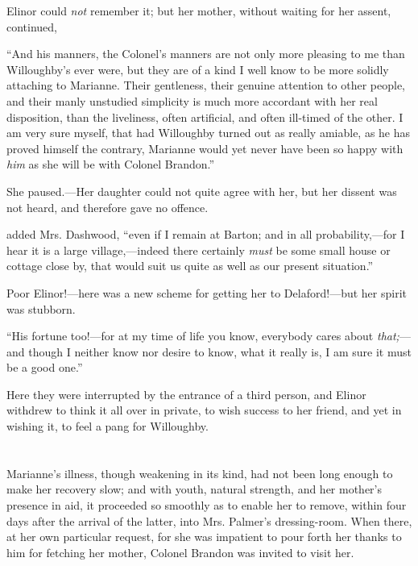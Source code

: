 Elinor could {\em not} remember it; but her mother, without waiting for her assent, continued,

“And his manners, the Colonel's manners are not only more pleasing to me than Willoughby's ever were, but they are of a kind I well know to be more solidly attaching to Marianne. Their gentleness, their genuine attention to other people, and their manly unstudied simplicity is much more accordant with her real disposition, than the liveliness, often artificial, and often ill-timed of the other. I am very sure myself, that had Willoughby turned out as really amiable, as he has proved himself the contrary, Marianne would yet never have been so happy with {\em him} as she will be with Colonel Brandon.”

She paused.---Her daughter could not quite agree with her, but her dissent was not heard, and therefore gave no offence.

 added Mrs. Dashwood, “even if I remain at Barton; and in all probability,---for I hear it is a large village,---indeed there certainly {\em must} be some small house or cottage close by, that would suit us quite as well as our present situation.”

Poor Elinor!---here was a new scheme for getting her to Delaford!---but her spirit was stubborn.

“His fortune too!---for at my time of life you know, everybody cares about {\em that;}---and though I neither know nor desire to know, what it really is, I am sure it must be a good one.”

Here they were interrupted by the entrance of a third person, and Elinor withdrew to think it all over in private, to wish success to her friend, and yet in wishing it, to feel a pang for Willoughby.

\chapter{} %

Marianne's illness, though weakening in its kind, had not been long enough to make her recovery slow; and with youth, natural strength, and her mother's presence in aid, it proceeded so smoothly as to enable her to remove, within four days after the arrival of the latter, into Mrs. Palmer's dressing-room. When there, at her own particular request, for she was impatient to pour forth her thanks to him for fetching her mother, Colonel Brandon was invited to visit her.

